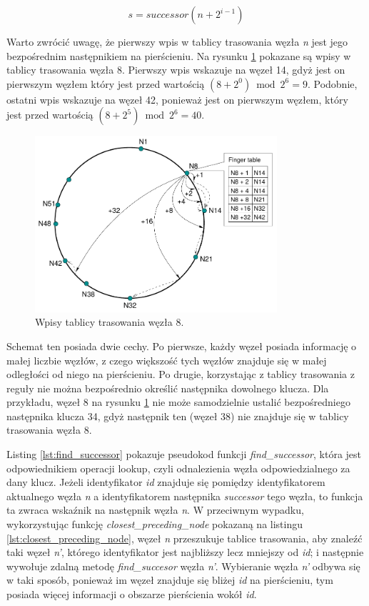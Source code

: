 \documentclass[12pt, twoside, openany]{report}
\begin{document}
\begin{equation}
\label{eq:start}
s=successor(n+2^{i-1})
\end{equation}

Warto zwrócić uwagę, że pierwszy wpis w tablicy trasowania węzła \textit{n} jest jego bezpośrednim następnikiem na pierścieniu. Na rysunku \ref{fig:finger_table} pokazane są wpisy w tablicy trasowania węzła 8. Pierwszy wpis wskazuje na węzeł 14, gdyż jest on pierwszym węzłem który jest przed wartością $(8+2^0) \bmod 2^6=9$. Podobnie, ostatni wpis wskazuje na węzeł 42, ponieważ jest on pierwszym węzłem, który jest przed wartością $(8+2^5) \bmod 2^6=40$.

\begin{figure}[H]
\centering
\includegraphics[width=0.8\textwidth,height=\textheight,keepaspectratio]{finger_table.png}
\caption{Wpisy tablicy trasowania węzła 8.}
\label{fig:finger_table}
\end{figure}

Schemat ten posiada dwie cechy. Po pierwsze, każdy węzeł posiada informację o małej liczbie węzłów, z czego większość tych węzłów znajduje się w małej odległości od niego na pierścieniu. Po drugie, korzystając z tablicy trasowania z reguły nie można bezpośrednio określić następnika dowolnego klucza. Dla przykładu, węzeł 8 na rysunku \ref{fig:finger_table} nie może samodzielnie ustalić bezpośredniego następnika klucza 34, gdyż następnik ten (węzeł 38) nie znajduje się w tablicy trasowania węzła 8.

Listing \ref{lst:find_successor} pokazuje pseudokod funkcji \textit{find\_successor}, która jest odpowiednikiem operacji lookup, czyli odnalezienia węzła odpowiedzialnego za dany klucz. Jeżeli identyfikator \textit{id} znajduje się pomiędzy identyfikatorem aktualnego węzła \textit{n} a identyfikatorem następnika \textit{successor} tego węzła, to funkcja ta zwraca wskaźnik na następnik węzła \textit{n}. W przeciwnym wypadku, wykorzystując funkcję \textit{closest\_preceding\_node} pokazaną na listingu \ref{lst:closest_preceding_node}, węzeł \textit{n} przeszukuje tablice trasowania, aby znaleźć taki węzeł \textit{n'}, którego identyfikator jest najbliższy lecz mniejszy od \textit{id}; i następnie wywołuje zdalną metodę \textit{find\_succesor} węzła \textit{n'}. Wybieranie węzła \textit{n'} odbywa się w taki sposób, ponieważ im węzeł znajduje się bliżej \textit{id} na pierścieniu, tym posiada więcej informacji o obszarze pierścienia wokół \textit{id}.
\end{document}
